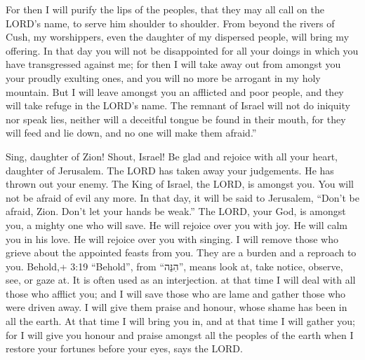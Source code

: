  For then I will purify the lips of the peoples, that they
may all call on the LORD's name, to serve him shoulder to shoulder.
 From beyond the rivers of Cush, my worshippers, even the
daughter of my dispersed people, will bring my offering. 
In that day you will not be disappointed for all your doings in which
you have transgressed against me; for then I will take away out from
amongst you your proudly exulting ones, and you will no more be arrogant
in my holy mountain.  But I will leave amongst you an
afflicted and poor people, and they will take refuge in the LORD's name.
 The remnant of Israel will not do iniquity nor speak lies,
neither will a deceitful tongue be found in their mouth, for they will
feed and lie down, and no one will make them afraid.''

 Sing, daughter of Zion! Shout, Israel! Be glad and rejoice
with all your heart, daughter of Jerusalem.  The LORD has
taken away your judgements. He has thrown out your enemy. The King of
Israel, the LORD, is amongst you. You will not be afraid of evil any
more.  In that day, it will be said to Jerusalem, ``Don't
be afraid, Zion. Don't let your hands be weak.''  The LORD,
your God, is amongst you, a mighty one who will save. He will rejoice
over you with joy. He will calm you in his love. He will rejoice over
you with singing.  I will remove those who grieve about the
appointed feasts from you. They are a burden and a reproach to you.
 Behold,+ 3:19 ``Behold'', from ``הִנֵּה'', means look at,
take notice, observe, see, or gaze at. It is often used as an
interjection. at that time I will deal with all those who afflict you;
and I will save those who are lame and gather those who were driven
away. I will give them praise and honour, whose shame has been in all
the earth.  At that time I will bring you in, and at that
time I will gather you; for I will give you honour and praise amongst
all the peoples of the earth when I restore your fortunes before your
eyes, says the LORD.
